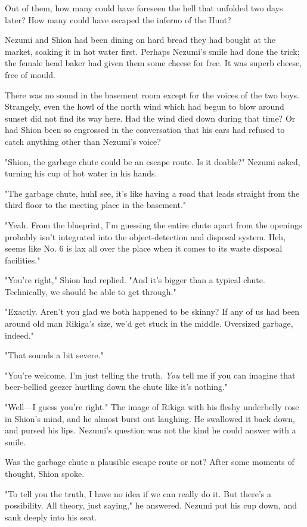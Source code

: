 Out of them, how many could have foreseen the hell that unfolded two
days later? How many could have escaped the inferno of the Hunt?

Nezumi and Shion had been dining on hard bread they had bought at the
market, soaking it in hot water first. Perhaps Nezumi's smile had done
the trick; the female head baker had given them some cheese for free. It
was superb cheese, free of mould.

There was no sound in the basement room except for the voices of the two
boys. Strangely, even the howl of the north wind which had begun to blow
around sunset did not find its way here. Had the wind died down during
that time? Or had Shion been so engrossed in the conversation that his
ears had refused to catch anything other than Nezumi's voice?

"Shion, the garbage chute could be an escape route. Is it doable?"
Nezumi asked, turning his cup of hot water in his hands.

"The garbage chute, huh\el I see, it's like having a road that leads
straight from the third floor to the meeting place in the basement."

"Yeah. From the blueprint, I'm guessing the entire chute apart from the
openings probably isn't integrated into the object-detection and
disposal system. Heh, seems like No. 6 is lax all over the place when it
comes to its waste disposal facilities."

"You're right," Shion had replied. "And it's bigger than a typical
chute. Technically, we should be able to get through."

"Exactly. Aren't you glad we both happened to be skinny? If any of us
had been around old man Rikiga's size, we'd get stuck in the middle.
Oversized garbage, indeed."

"That sounds a bit severe."

"You're welcome. I'm just telling the truth. \emph{You} tell me if you can
imagine that beer-bellied geezer hurtling down the chute like it's
nothing."

"Well---I guess you're right." The image of Rikiga with his fleshy
underbelly rose in Shion's mind, and he almost burst out laughing. He
swallowed it back down, and pursed his lips. Nezumi's question was not
the kind he could answer with a smile.

Was the garbage chute a plausible escape route or not? After some
moments of thought, Shion spoke.

"To tell you the truth, I have no idea if we can really do it. But
there's a possibility. All theory, just saying," he answered. Nezumi put
his cup down, and sank deeply into his seat.

